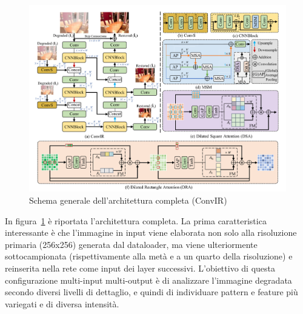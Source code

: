 \documentclass[a4paper,10pt,twocolumn]{article}
\begin{document}
\begin{figure}[t]
  \centering
  \includegraphics[width=\linewidth]{figures/architecture_complete.png}
  \caption{Schema generale dell'architettura completa (ConvIR)}
  \label{fig:architecture}
\end{figure}

In figura~\ref{fig:architecture} è riportata l'architettura completa. La prima caratteristica interessante è che l'immagine in input viene elaborata non solo alla risoluzione primaria (256x256) generata dal dataloader,
ma viene ulteriormente sottocampionata (rispettivamente alla metà e a un quarto della risoluzione) e reinserita nella rete come input dei layer successivi.
L'obiettivo di questa configurazione multi-input multi-output è di analizzare l'immagine degradata secondo diversi livelli di dettaglio, e quindi di individuare pattern e feature più variegati e di diversa intensità.
\end{document}
